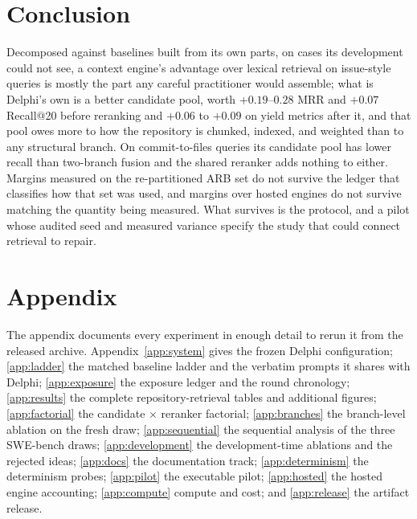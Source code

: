 \documentclass{article}
\newcommand{\system}{Delphi}
\begin{document}
\section{Conclusion}

Decomposed against baselines built from its own parts, on cases its development could not see, a context engine's advantage over lexical retrieval on issue-style queries is mostly the part any careful practitioner would assemble; what is \system{}'s own is a better candidate pool, worth $+0.19$--$0.28$ MRR and $+0.07$ Recall@20 before reranking and $+0.06$ to $+0.09$ on yield metrics after it, and that pool owes more to how the repository is chunked, indexed, and weighted than to any structural branch. On commit-to-files queries its candidate pool has lower recall than two-branch fusion and the shared reranker adds nothing to either. Margins measured on the re-partitioned ARB set do not survive the ledger that classifies how that set was used, and margins over hosted engines do not survive matching the quantity being measured. What survives is the protocol, and a pilot whose audited seed and measured variance specify the study that could connect retrieval to repair.




\clearpage
\appendix

\section*{Appendix}

The appendix documents every experiment in enough detail to rerun it from the
released archive. Appendix~\ref{app:system} gives the frozen \system{}
configuration; \ref{app:ladder} the matched baseline ladder and the verbatim
prompts it shares with \system{}; \ref{app:exposure} the exposure ledger and the
round chronology; \ref{app:results} the complete repository-retrieval tables
and additional figures; \ref{app:factorial} the candidate $\times$ reranker
factorial; \ref{app:branches} the branch-level ablation on the fresh draw;
\ref{app:sequential} the sequential analysis of the three SWE-bench draws;
\ref{app:development} the development-time ablations and the rejected ideas;
\ref{app:docs} the documentation track; \ref{app:determinism} the determinism
probes; \ref{app:pilot} the executable pilot; \ref{app:hosted} the hosted
engine accounting; \ref{app:compute} compute and cost; and \ref{app:release}
the artifact release.
\end{document}
